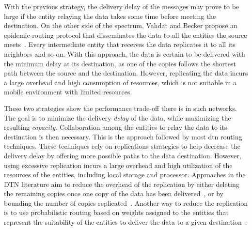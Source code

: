 With the previous strategy, the delivery delay of the messages may prove to be large if the entity relaying the data takes some time before meeting the destination. On the other side of the spectrum, Vahdat and Becker propose an epidemic routing protocol that disseminates the data to all the entities the source meets~\cite{vahdat2000epidemic}. Every intermediate entity that receives the data replicates it to all its neighbors and so on. With this approach, the data is certain to be delivered with the minimum delay at its destination, as one of the copies follows the shortest path between the source and the destination. However, replicating the data incurs a large overhead and high consumption of resources, which is not suitable in a mobile environment with limited resources.

These two strategies show the performance trade-off there is in such networks. The goal is to minimize the delivery \textit{delay} of the data, while maximizing the resulting \textit{capacity}. Collaboration among the entities to relay the data to its destination is then necessary. This is the approach followed by most \acrshort{dtn} routing techniques. These techniques rely on replications strategies to help decrease the delivery delay by offering more possible paths to the data destination. However, using excessive replication incurs a large overhead and high utilization of the resources of the entities, including local storage and processor. Approaches in the DTN literature aim to reduce the overhead of the replication by either deleting the remaining copies once one copy of the data has been delivered~\cite{balasubramanian2007dtn,juang2002energy}, or by bounding the number of copies replicated~\cite{spyropoulos2005spray,harras2005delay}. Another way to reduce the replication is to use probabilistic routing based on weights assigned to the entities that represent the suitability of the entities to deliver the data to a given destination~\cite{davis2001wearable,burgess2006maxprop,lindgren2003probabilistic,davis2001wearable,burns2005mv,juang2002energy}.




